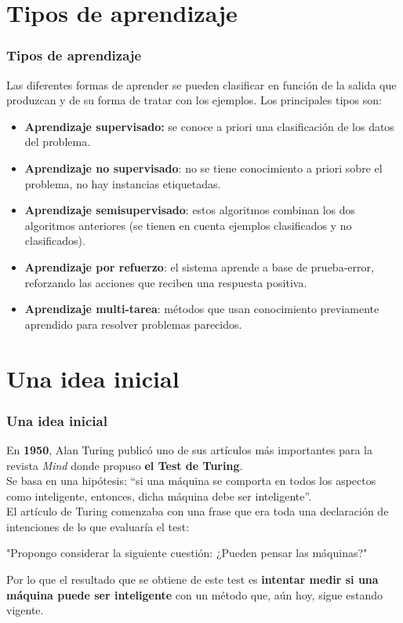 \documentclass[9pt]{beamer} %
\begin{document}
	\section{Tipos de aprendizaje}
	\begin{frame}
	\frametitle{Tipos de aprendizaje}
	Las diferentes formas de aprender se pueden clasificar en función de la salida que produzcan y de su forma de tratar con los ejemplos. Los principales tipos son:
\begin{itemize}
	\item \textbf{Aprendizaje supervisado:} se conoce a priori una clasificación de los datos del problema.
	\item \textbf{Aprendizaje no supervisado}: no se tiene conocimiento a priori sobre el problema, no hay instancias etiquetadas.
	\item \textbf{Aprendizaje semisupervisado}: estos algoritmos combinan los dos algoritmos anteriores (se tienen en cuenta ejemplos clasificados y no clasificados).
	\item \textbf{Aprendizaje por refuerzo}: el sistema aprende a base de prueba-error, reforzando las acciones que reciben una respuesta positiva.
	\item \textbf{Aprendizaje multi-tarea}: métodos que usan conocimiento previamente aprendido para resolver problemas parecidos.
\end{itemize}
	\end{frame}
	
\section{Una idea inicial}
	\begin{frame}
	\frametitle{Una idea inicial}
	En \textbf{1950}, Alan Turing publicó uno de sus artículos más importantes para la revista \textit{Mind} donde propuso \textbf{el Test de Turing}.\\
	
	Se basa en una hipótesis: ``si una máquina se comporta en todos los aspectos como inteligente, entonces, dicha máquina debe ser inteligente''.\\

    El artículo de Turing comenzaba con una frase que era toda una declaración de intenciones de lo que evaluaría el test:
    \begin{shaded}
    "Propongo considerar la siguiente cuestión: ¿Pueden pensar las máquinas?"
    \end{shaded}
    
    Por lo que el resultado que se obtiene de este test es \textbf{intentar medir si una máquina puede ser inteligente} con un método que, aún hoy, sigue estando vigente.\\
	\end{frame}
	
\end{document}
